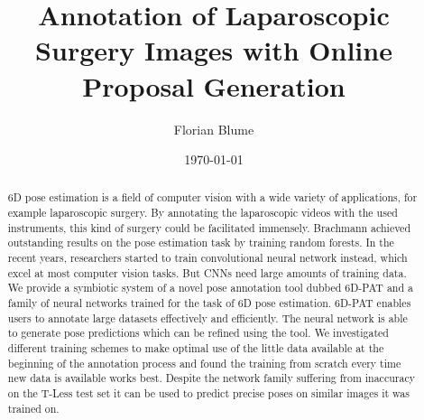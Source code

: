 \documentclass[english,color]{tudscrreprt}
\begin{document}
\date{\today}
\author{Florian Blume}
\title{%
  Annotation of Laparoscopic Surgery Images with Online Proposal
Generation
}
\maketitle



\begin{abstract}
6D pose estimation is a field of computer vision with a wide variety of applications, for example laparoscopic surgery. By annotating the laparoscopic videos with the used instruments, this kind of surgery could be facilitated immensely. Brachmann \etal achieved outstanding results on the pose estimation task by training random forests. In the recent years, researchers started to train convolutional neural network instead, which excel at most computer vision tasks. But CNNs need large amounts of training data. We provide a symbiotic system of a novel pose annotation tool dubbed 6D-PAT and a family of neural networks trained for the task of 6D pose estimation. 6D-PAT enables users to annotate large datasets effectively and efficiently. The neural network is able to generate pose predictions which can be refined using the tool. We investigated different training schemes to make optimal use of the little data available at the beginning of the annotation process and found the training from scratch every time new data is available works best. Despite the network family suffering from inaccuracy on the T-Less test set it can be used to predict precise poses on similar images it was trained on.
\end{abstract}

\tableofcontents











\newpage
\thispagestyle{plain}
\printacronyms

\listoffigures

\listoftables




\end{document}
